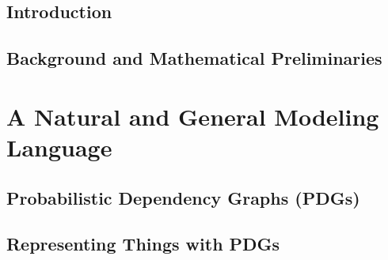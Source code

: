 \documentclass[tocprelim,
    ]{cornellmodified}
\begin{document}
\contentspage
\figurelistpage

\normalspacing \setcounter{page}{1} 
\pagestyle{cornell} \addtolength{\parskip}{0.5\baselineskip}


\chapter{Introduction}
    
\chapter{Background and Mathematical Preliminaries}
    

\part{A Natural and General Modeling Language}
    \label{part:univ-model}

\chapter{Probabilistic Dependency Graphs (PDGs)} 
    
    
\chapter{Representing Things with PDGs}
    
     
\end{document}
